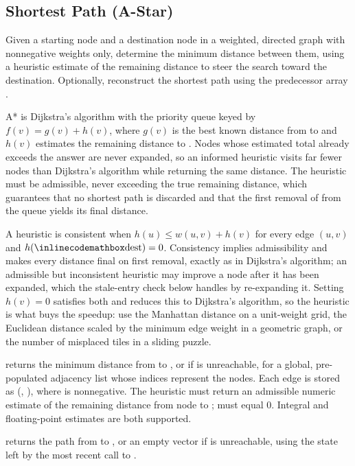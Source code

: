 \subsection{Shortest Path (A-Star)}
\label{sec:4.3.4}
Given a starting node and a destination node in a weighted, directed graph with nonnegative weights only, determine the minimum distance between them, using a heuristic estimate of the remaining distance to steer the search toward the destination. Optionally, reconstruct the shortest path using the predecessor array .

A* is Dijkstra's algorithm with the priority queue keyed by $f(v) = g(v) + h(v)$, where $g(v)$ is the best known distance from  to  and $h(v)$ estimates the remaining distance to . Nodes whose estimated total already exceeds the answer are never expanded, so an informed heuristic visits far fewer nodes than Dijkstra's algorithm while returning the same distance. The heuristic must be admissible, never exceeding the true remaining distance, which guarantees that no shortest path is discarded and that the first removal of  from the queue yields its final distance.

A heuristic is consistent when $h(u) \leq w(u, v) + h(v)$ for every edge $(u, v)$ and $h({\inlinecodemath{dest}}) = 0$. Consistency implies admissibility and makes every distance final on first removal, exactly as in Dijkstra's algorithm; an admissible but inconsistent heuristic may improve a node after it has been expanded, which the stale-entry check below handles by re-expanding it. Setting $h(v) = 0$ satisfies both and reduces this to Dijkstra's algorithm, so the heuristic is what buys the speedup: use the Manhattan distance on a unit-weight grid, the Euclidean distance scaled by the minimum edge weight in a geometric graph, or the number of misplaced tiles in a sliding puzzle.

\begin{compactitem}
  \item {} returns the minimum distance from  to , or  if  is unreachable, for a global, pre-populated adjacency list  whose indices represent the nodes. Each edge is stored as (, ), where  is nonnegative. The heuristic  must return an admissible numeric estimate of the remaining distance from node  to ;  must equal $0$. Integral and floating-point estimates are both supported.
  \item {} returns the path from  to , or an empty vector if  is unreachable, using the state left by the most recent call to .
\end{compactitem}


